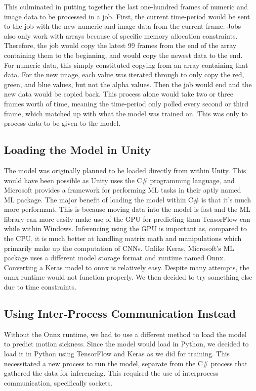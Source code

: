 This culminated in putting together the last one-hundred frames of numeric and image data to be processed in a job.
First, the current time-period would be sent to the job with the new numeric and image data from the current frame.
Jobs also only work with arrays because of specific memory allocation constraints.
Therefore, the job would copy the latest 99 frames from the end of the array containing them to the beginning, and would copy the newest data to the end.
For numeric data, this simply constituted copying from an array containing that data.
For the new image, each value was iterated through to only copy the red, green, and blue values, but not the alpha values.
Then the job would end and the new data would be copied back.
This process alone would take two or three frames worth of time, meaning the time-period only polled every second or third frame, which matched up with what the model was trained on.
This was only to process data to be given to the model.

\subsection{Loading the Model in Unity}
\label{subsec:loading}

The model was originally planned to be loaded directly from within Unity.
This would have been possible as Unity uses the C\# programming language, and Microsoft provides a framework for performing ML tasks in their aptly named ML package.
The major benefit of loading the model within C\# is that it's much more performant.
This is because moving data into the model is fast and the ML library can more easily make use of the GPU for predicting than TensorFlow can while within Windows.
Inferencing using the GPU is important as, compared to the CPU, it is much better at handling matrix math and manipulations which primarily make up the computation of CNNs.
Unlike Keras, Microsoft's ML package uses a different model storage format and runtime named Onnx.
Converting a Keras model to onnx is relatively easy.
Despite many attempts, the onnx runtime would not function properly.
We then decided to try something else due to time constraints.

\subsection{Using Inter-Process Communication Instead}
\label{subsec:ipc}

Without the Onnx runtime, we had to use a different method to load the model to predict motion sickness.
Since the model would load in Python, we decided to load it in Python using TensorFlow and Keras as we did for training.
This necessitated a new process to run the model, separate from the C\# process that gathered the data for inferencing.
This required the use of interprocess communication, specifically sockets.

